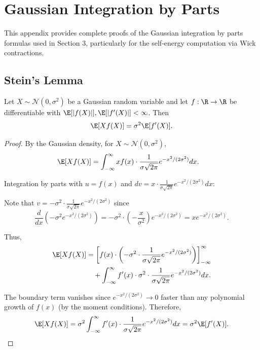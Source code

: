 
\section{Gaussian Integration by Parts}

This appendix provides complete proofs of the Gaussian integration by parts formulas used in Section 3, particularly for the self-energy computation via Wick contractions.

\subsection{Stein's Lemma}

\begin{lemma}\label{lem:stein-univariate}
Let $X \sim \mathcal{N}(0, \sigma^2)$ be a Gaussian random variable and let $f: \R \to \R$ be differentiable with $\E[|f(X)|], \E[|f'(X)|] < \infty$. Then
\begin{equation}\label{eq:stein-univariate}
\E[X f(X)] = \sigma^2 \E[f'(X)].
\end{equation}
\end{lemma}

\begin{proof}
By the Gaussian density, for $X \sim \mathcal{N}(0, \sigma^2)$,
\begin{align}
\E[X f(X)]
&= \int_{-\infty}^\infty x f(x) \cdot \frac{1}{\sigma\sqrt{2\pi}} e^{-x^2/(2\sigma^2)} dx.
\end{align}

Integration by parts with $u = f(x)$ and $dv = x \cdot \frac{1}{\sigma\sqrt{2\pi}} e^{-x^2/(2\sigma^2)} dx$:

Note that $v = -\sigma^2 \cdot \frac{1}{\sigma\sqrt{2\pi}} e^{-x^2/(2\sigma^2)}$ since
\[
\frac{d}{dx}\left(-\sigma^2 e^{-x^2/(2\sigma^2)}\right) = -\sigma^2 \cdot \left(-\frac{x}{\sigma^2}\right) e^{-x^2/(2\sigma^2)} = x e^{-x^2/(2\sigma^2)}.
\]

Thus,
\begin{align}
\E[X f(X)]
&= \left[f(x) \cdot \left(-\sigma^2 \cdot \frac{1}{\sigma\sqrt{2\pi}} e^{-x^2/(2\sigma^2)}\right)\right]_{-\infty}^\infty \\
&\quad + \int_{-\infty}^\infty f'(x) \cdot \sigma^2 \cdot \frac{1}{\sigma\sqrt{2\pi}} e^{-x^2/(2\sigma^2)} dx.
\end{align}

The boundary term vanishes since $e^{-x^2/(2\sigma^2)} \to 0$ faster than any polynomial growth of $f(x)$ (by the moment conditions). Therefore,
\begin{align}
\E[X f(X)] = \sigma^2 \int_{-\infty}^\infty f'(x) \cdot \frac{1}{\sigma\sqrt{2\pi}} e^{-x^2/(2\sigma^2)} dx = \sigma^2 \E[f'(X)].
\end{align}
\end{proof}

